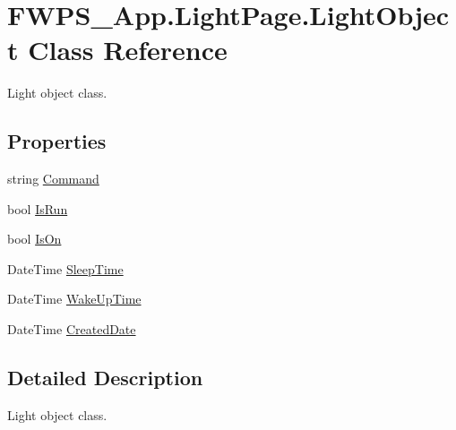 \hypertarget{class_f_w_p_s___app_1_1_light_page_1_1_light_object}{}\section{F\+W\+P\+S\+\_\+\+App.\+Light\+Page.\+Light\+Object Class Reference}
\label{class_f_w_p_s___app_1_1_light_page_1_1_light_object}


Light object class.  


\subsection*{Properties}
\begin{DoxyCompactItemize}
\item 
string \mbox{\hyperlink{class_f_w_p_s___app_1_1_light_page_1_1_light_object_a7459dbd8eac8caecb23e0966983954bf}{Command}}
\item 
bool \mbox{\hyperlink{class_f_w_p_s___app_1_1_light_page_1_1_light_object_a59823f398b324b12939af0974d17d683}{Is\+Run}}
\item 
bool \mbox{\hyperlink{class_f_w_p_s___app_1_1_light_page_1_1_light_object_adc592a5e4360402847590971a98a4c2c}{Is\+On}}
\item 
Date\+Time \mbox{\hyperlink{class_f_w_p_s___app_1_1_light_page_1_1_light_object_acf6f2f1ced24c0477e888e49b5d08299}{Sleep\+Time}}
\item 
Date\+Time \mbox{\hyperlink{class_f_w_p_s___app_1_1_light_page_1_1_light_object_a9b9e2d8c8fbe32eac770fd343a4d0384}{Wake\+Up\+Time}}
\item 
Date\+Time \mbox{\hyperlink{class_f_w_p_s___app_1_1_light_page_1_1_light_object_a9b6f9986f06e15cb42f58867e83ee52e}{Created\+Date}}
\end{DoxyCompactItemize}


\subsection{Detailed Description}
Light object class. 

